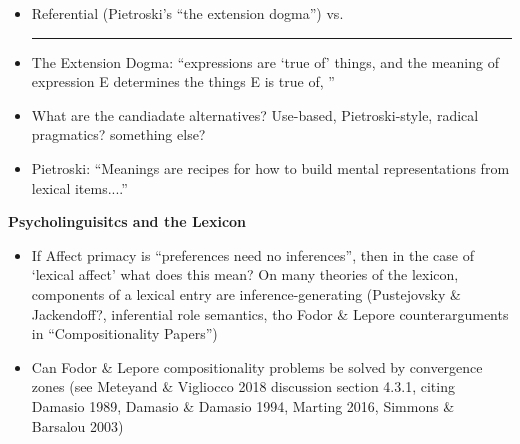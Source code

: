 \documentclass[12pt,letterpaper,table,svgnames,dvipsnames]{article}
\begin{document}
\begin{itemize}

    \item Referential (Pietroski's ``the extension dogma'') vs.  \rule{10em}{0.5pt}


    \item The Extension Dogma: ``expressions are `true of' things, and the meaning of expression E determines the things E is true of, ''

    \item What are the candiadate alternatives? Use-based, Pietroski-style, radical pragmatics? something else?

    \item Pietroski: ``Meanings are recipes for how to build mental representations from lexical items....''





\end{itemize}


\noindent \textbf{Psycholinguisitcs and the Lexicon}


\begin{itemize}
    \item If Affect primacy is ``preferences need no inferences'', then in the case of `lexical affect' what does this mean? On many theories of the lexicon, components of a lexical entry are inference-generating (Pustejovsky \& Jackendoff?, inferential role semantics, tho Fodor \& Lepore counterarguments in ``Compositionality Papers'')

    \item Can Fodor \& Lepore compositionality problems be solved by convergence zones (see Meteyand \& Vigliocco 2018 discussion section 4.3.1, citing Damasio 1989, Damasio \& Damasio 1994, Marting 2016, Simmons \& Barsalou 2003)
\end{itemize}
\end{document}
